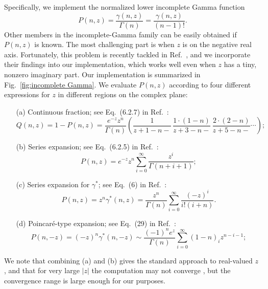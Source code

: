 \documentclass[final,1p,times]{elsarticle}
\begin{document}
Specifically, we implement the normalized lower incomplete Gamma function \cite{NISThandbook}
\begin{equation}
P(n, z) = \frac{\gamma(n, z)}{\Gamma(n)}=\frac{\gamma(n,z)}{(n-1)!}.
\end{equation}
Other members in the incomplete-Gamma family can be easily obtained if $P(n,z)$ is known. 
The most challenging part is when $z$ is on the negative real axis. Fortunately, this problem is recently tackled in Ref.~\cite{GilACM17}, and we incorporate their findings into our implementation, which works well even when $z$ has a tiny, nonzero imaginary part. Our implementation is summarized in Fig.~\ref{fig:incomplete Gamma}. We evaluate $P(n,z)$ according to four different expressions for $z$ in different regions on the complex plane:
\begin{enumerate}
	\item[(a)] Continuous fraction; see Eq.~(6.2.7) in Ref.~\cite{NumericalRecipes}:
	\begin{equation}
	Q(n, z) = 1-P(n, z) = \frac{e^{-z}z^n}{\Gamma(n)}\left(\frac{1}{z+1-n-}\,\frac{1\cdot(1-n)}{z+3-n-}\,
	\frac{2\cdot(2-n)}{z+5-n-}\cdots\right);
	\end{equation}
	\item[(b)] Series expansion; see Eq.~(6.2.5) in Ref.~\cite{NumericalRecipes}:
	\begin{equation}
	P(n, z) = e^{-z} z^n \sum_{i=0}^\infty \frac{z^i}{\Gamma(n+i+1)};
	\end{equation}
	\item[(c)] Series expansion for $\gamma^*$; see Eq.~(6) in Ref.~\cite{GilACM17}:
	\begin{equation}
	P(n, z) = z^n \gamma^*(n, z) = \frac{z^n}{\Gamma(n)} \sum_{i=0}^\infty \frac{(-z)^i}{i!(i+n)}.
	\end{equation}
	\item[(d)] Poincar\'{e}-type expansion; see Eq.~(29) in Ref.~\cite{GilACM17}:
	\begin{equation}
	P(n, -z) = (-z)^n \gamma^*(n, -z)\sim \frac{(-1)^n e^z}{\Gamma(n)} \sum_{i=0}^\infty (1-n)_i z^{n-i-1};
	\end{equation}

\end{enumerate}
We note that combining (a) and (b) gives the standard approach to real-valued $z$ \cite{NumericalRecipes}, and that for very large $|z|$ the computation may not converge \cite{GilACM17}, but the convergence range is large enough for our purposes. 
\end{document}
